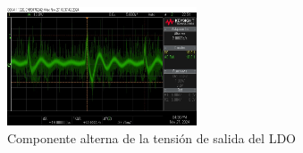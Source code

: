 \begin{figure}[h]
    \centering
    \includegraphics[width=0.5\textwidth]{images/2-hardware/componentes/ldo/picosConLDO.jpg}
    \caption{Componente alterna de la tensión de salida del LDO}
    \label{fig:hardware/modulos/ldo-sin-picos}
\end{figure}